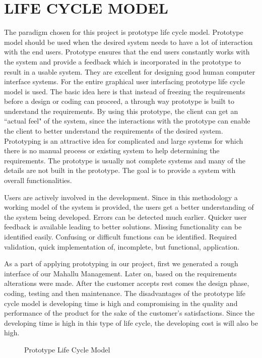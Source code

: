 \documentclass[12pt,a4paper,oneside]{report}
\begin{document}
\section{LIFE CYCLE MODEL}
The paradigm chosen for this project is prototype life cycle model. Prototype model should be used when the desired system needs to have a lot of interaction with the end users. Prototype ensures that the end users constantly works with the system and provide a feedback which is incorporated in the prototype to result in a usable system. They are excellent for designing good human computer interface systems. For the entire graphical user interfacing prototype life cycle model is used. The basic idea here is that instead of freezing the requirements before a design or coding can proceed, a through way prototype is built to understand the requirements. By using this prototype, the client can get an ``actual feel" of the system, since the interactions with the prototype can enable the client to better understand the requirements of the desired system. Prototyping is an attractive idea for complicated and large systems for which there is no manual process or existing system to help determining the requirements. The prototype is usually not complete systems and many of the details are not built in the prototype. The goal is to provide a system with overall functionalities.
\par
Users are actively involved in the development. Since in this methodology a working model of the system is provided, the users get a better understanding of the system being developed. Errors can be detected much earlier. Quicker user feedback is available leading to better solutions. Missing functionality can be identified easily. Confusing or difficult functions can be identified. Required validation, quick implementation of, incomplete, but functional, application.
\par As a part of applying prototyping in our project, first we generated a rough interface of our Mahallu Management. Later on, based on the requirements alterations were made. After the customer accepts rest comes the design phase, coding, testing and then maintenance. The disadvantages of the prototype life cycle model is developing time is high and compromising in the quality and performance of the product for the sake of the customer's satisfactions. Since the developing time is high in this type of life cycle, the developing cost is will also be high. 

\begin{figure}[h]
\begin{center}
\caption{Prototype Life Cycle Model}
\end{center}
\end{figure}
\end{document}
